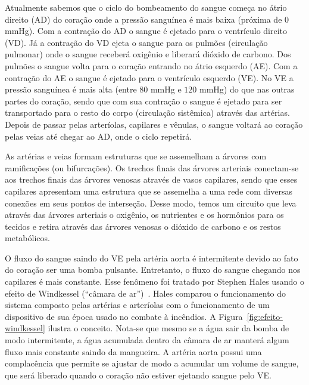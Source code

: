 Atualmente sabemos que o ciclo do bombeamento do sangue começa no átrio direito (AD) do coração onde a pressão 
sanguínea é mais baixa (próxima de $0$ mmHg). Com a contração do AD o sangue é ejetado para 
o ventrículo direito (VD). Já a contração do VD ejeta o sangue para os pulmões 
(circulação pulmonar) onde o sangue receberá oxigênio e liberará dióxido de carbono. 
Dos pulmões o sangue volta para o coração entrando no átrio esquerdo (AE). Com a contração 
do AE o sangue é ejetado para o ventrículo esquerdo (VE). No VE a pressão sanguínea 
é mais alta (entre $80$ mmHg e $120$ mmHg) do que nas outras partes do coração,
sendo que com sua contração o sangue é ejetado para ser transportado para 
o resto do corpo (circulação sistêmica) através das artérias.
Depois de passar pelas arteríolas, capilares e vênulas, o sangue voltará ao coração pelas veias 
até chegar ao AD, onde o ciclo repetirá.

As artérias e veias formam estruturas que se assemelham a árvores com ramificações 
(ou bifurcações). Os trechos finais das árvores arteriais conectam-se aos trechos 
finais das árvores venosas através de vasos capilares, sendo que esses capilares 
apresentam uma estrutura que se assemelha a uma rede com diversas conexões em seus
pontos de interseção. Desse modo, temos um circuito que leva através das árvores arteriais 
o oxigênio, os nutrientes e os hormônios para os tecidos e retira através das árvores venosas 
o dióxido de carbono e os restos metabólicos.

O fluxo do sangue saindo do VE pela artéria aorta é intermitente devido ao fato do coração 
ser uma bomba pulsante. Entretanto, o fluxo do sangue chegando nos capilares é mais constante. 
Esse fenômeno foi tratado por Stephen Hales usando o efeito de Windkessel (``câmara de ar'')~\cite{Hales1733}.
Hales comparou o funcionamento do sistema composto pelas artérias e arteríolas 
com o funcionamento de um dispositivo de sua época usado no combate à incêndios. A Figura~\ref{fig:efeito-windkessel}
ilustra o conceito. Nota-se que mesmo se a água sair da bomba de modo intermitente, a água 
acumulada dentro da câmara de ar manterá algum fluxo mais constante saindo da mangueira. A artéria aorta 
possui uma complacência que permite se ajustar de modo a acumular um volume de sangue, que 
será liberado quando o coração não estiver ejetando sangue pelo VE.

